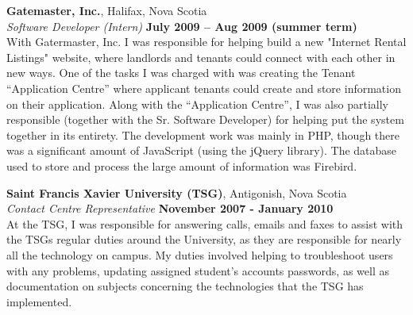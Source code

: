 \documentclass[margin,line]{resume}
\begin{document}
\begin{resume}
	{\bf Gatemaster, Inc.}, Halifax, Nova Scotia \vspace{2mm}\\\vspace{1mm}%
	{\sl Software Developer (Intern)} \hfill {\bf July 2009 -- Aug 2009 (summer term)}\\
	With Gatermaster, Inc. I was responsible for helping build a new "Internet Rental Listings" website, where landlords and tenants could connect with each other in new ways. One of the tasks I was charged with was creating the Tenant ``Application Centre'' where applicant tenants could create and store information on their application. Along with the ``Application Centre'', I was also partially responsible (together with the Sr. Software Developer) for helping put the system together in its entirety. The development work was mainly in PHP, though there was a significant amount of JavaScript (using the jQuery library). The database used to store and process the large amount of information was Firebird.


\newpage

	{\bf Saint Francis Xavier University (TSG)}, Antigonish, Nova Scotia \vspace{2mm}\\\vspace{1mm}%
	{\sl Contact Centre Representative} \hfill {\bf November 2007 - January 2010}\\
	At the TSG, I was responsible for answering calls, emails and faxes to assist with the TSGs regular duties around the University, as they are responsible for nearly all the technology on campus. My duties involved helping to troubleshoot users with any problems, updating assigned student's accounts passwords, as well as documentation on subjects concerning the technologies that the TSG has implemented.
	

\end{resume}
\end{document}
